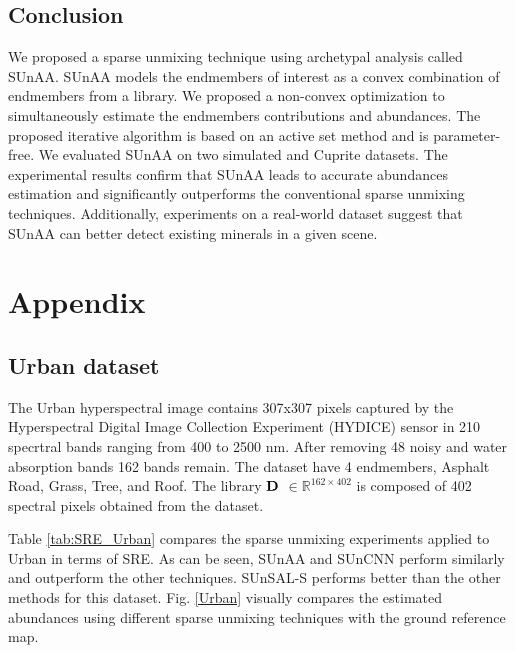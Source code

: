 \section{Conclusion}
\label{sec:con}

We proposed a sparse unmixing technique using archetypal analysis called SUnAA. SUnAA models the endmembers of interest as a convex combination of endmembers from a library. We proposed a non-convex optimization to simultaneously estimate the endmembers contributions and abundances. The proposed iterative algorithm is based on an active set method and is parameter-free. We evaluated SUnAA on two simulated and Cuprite datasets. The experimental results confirm that SUnAA leads to accurate abundances estimation and significantly outperforms the conventional sparse unmixing techniques. Additionally, experiments on a real-world dataset suggest that SUnAA can better detect existing minerals in a given scene. 

\chapter*{Appendix}

\section{Urban dataset}

The Urban hyperspectral image contains
307x307 pixels captured by the Hyperspectral
Digital Image Collection Experiment (HYDICE) \cite{rickard_hydice_1993} sensor in 210 specrtral bands ranging from 400 to 2500
nm. After removing 48 noisy and water absorption bands 162 bands remain. The dataset have 4 endmembers, Asphalt Road, Grass, Tree, and Roof. The library ${\bf D}$ $ \in \mathbb{R}^{162\times 402}$ is composed of 402 spectral pixels obtained from the dataset.

Table \ref{tab:SRE_Urban} compares the sparse unmixing experiments applied to Urban in terms of SRE. As can be seen, SUnAA and SUnCNN perform similarly and outperform the other techniques. SUnSAL-S performs better than the other methods for this dataset. Fig. \ref{Urban} visually compares the estimated abundances using different sparse unmixing techniques with the ground reference map.   

